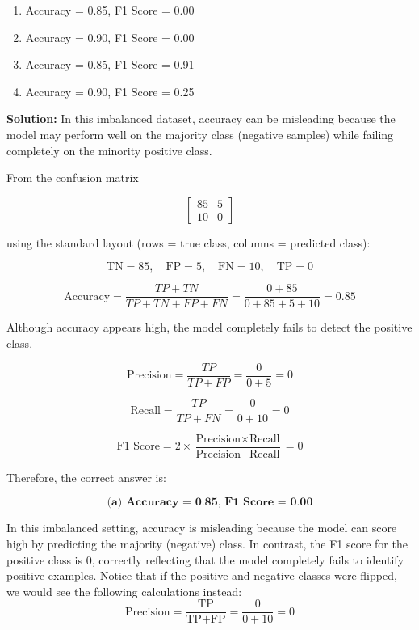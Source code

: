 \documentclass{article}
\begin{document}
\begin{enumerate}
    \begin{enumerate}
        \item Accuracy = 0.85, F1 Score = 0.00
        \item Accuracy = 0.90, F1 Score = 0.00
        \item Accuracy = 0.85, F1 Score = 0.91
        \item Accuracy = 0.90, F1 Score = 0.25
    \end{enumerate}

    \textbf{Solution:} \newline
In this imbalanced dataset, accuracy can be misleading because the model may perform well on the majority class (negative samples) while failing completely on the minority positive class.

From the confusion matrix

\[
\begin{bmatrix}
85 & 5 \\
10 & 0
\end{bmatrix}
\]

using the standard layout (rows = true class, columns = predicted class):

\[
\text{TN} = 85, \quad
\text{FP} = 5, \quad
\text{FN} = 10, \quad
\text{TP} = 0
\]

\[
\text{Accuracy} = \frac{TP + TN}{TP + TN + FP + FN}
= \frac{0 + 85}{0 + 85 + 5 + 10}
= 0.85
\]

Although accuracy appears high, the model completely fails to detect the positive class.

\[
\text{Precision} = \frac{TP}{TP + FP} = \frac{0}{0 + 5} = 0
\]

\[
\text{Recall} = \frac{TP}{TP + FN} = \frac{0}{0 + 10} = 0
\]

\[
\text{F1 Score} = 2 \times \frac{\text{Precision} \times \text{Recall}}{\text{Precision} + \text{Recall}} = 0
\]

Therefore, the correct answer is:

\[
\boxed{\textbf{(a) Accuracy = 0.85, F1 Score = 0.00}}
\]
    
    In this imbalanced setting, accuracy is misleading because the model can score high by predicting the majority (negative) class. In contrast, the F1 score for the positive class is 0, correctly reflecting that the model completely fails to identify positive examples. Notice that if the positive and negative classes were flipped, we would see the following calculations instead:
    \[
    \text{Precision} = \frac{\text{TP}}{\text{TP} + \text{FP}} = \frac{0}{0 + 10} = 0
    \]
    

\end{enumerate}
\end{document}
